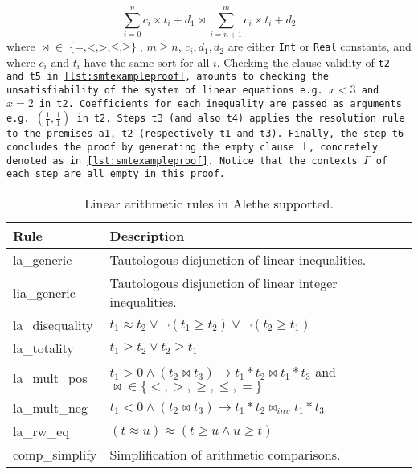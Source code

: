 \begin{equation}
\sum_{i=0}^{n}c_i\times{}t_i + d_1\bowtie \sum_{i=n+1}^{m} c_i\times{}t_i + d_2
\label{eqn:inequality}
\end{equation}
%
where $\mathop{\bowtie} \mathrel{\in} \mathop{\{=, <, >, \leq, \geq\}}$, $m\geq n$, $c_i, d_1, d_2$ are either \lstinline[language=SMT,basicstyle=\ttfamily\footnotesize]{Int} or \lstinline[language=SMT,basicstyle=\ttfamily\footnotesize]{Real}
constants, and where $c_i$ and $t_i$ have the same sort for all $i$.
Checking the clause validity of \tt{t2} and \tt{t5} in \cref{lst:smtexampleproof}, amounts to checking the unsatisfiability of the system of linear equations e.g. $x < 3$ and $x = 2$ in \tt{t2}.
Coefficients for each inequality are passed as arguments e.g. $(\frac{1}{1},\frac{1}{1})$ in \tt{t2}.
Steps \tt{t3} (and also \tt{t4}) applies the \colorbox{purple!30}{\texttt{resolution}} rule to the premises \tt{a1}, \tt{t2} (respectively \tt{t1} and \tt{t3}).
Finally, the step \texttt{t6} concludes the proof by generating the empty clause $\bot$, concretely denoted as  in \cref{lst:smtexampleproof}.
Notice that the contexts \colorbox{blue!30}{$\Gamma$} of each step are all empty in this proof.

\begin{table}[tp]
  \centering
  \begin{tabular}{ll}
  Rule & Description \\ \hline
  la\_generic & Tautologous disjunction of linear inequalities. \\
  lia\_generic & Tautologous disjunction of linear integer inequalities. \\
  la\_disequality & $t_1 \approx t_2 \lor \neg (t_1 \geq t_2) \lor \neg (t_2 \geq t_1)$ \\
  la\_totality & $t_1 \geq t_2 \lor t_2 \geq t_1$ \\
  la\_mult\_pos & $t_1 > 0 \land (t_2 \bowtie t_3) \rightarrow t_1 * t_2 \bowtie t_1 * t_3$ and $\bowtie \in \{<, >, \geq, \leq, =\}$ \\
  la\_mult\_neg & $t_1 < 0 \land (t_2 \bowtie t_3) \rightarrow t_1 * t_2 \bowtie_{inv} t_1 * t_3$ \\
  la\_rw\_eq & $(t \approx u) \approx (t \geq u \land u \geq t)$ \\
  comp\_simplify & Simplification of arithmetic comparisons. \\
  \end{tabular}
  \caption{Linear arithmetic rules in Alethe supported.}
  \label{table:linear-arith-rules}
\end{table}

